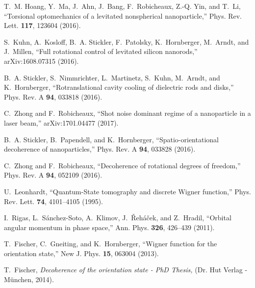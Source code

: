 \documentclass[%
 twocolumn,
 amsmath,amssymb,
 aps,
 pra,
]{revtex4-1}
\begin{document}
\begin{thebibliography}{10}
T.~M. Hoang, Y.~Ma, J.~Ahn, J.~Bang, F.~Robicheaux, Z.-Q. Yin, and T.~Li,
  \enquote{{Torsional optomechanics of a levitated nonspherical nanoparticle},}
  Phys. Rev. Lett. \textbf{117}, 123604 (2016).

S.~Kuhn, A.~Kosloff, B.~A. Stickler, F.~Patolsky, K.~Hornberger, M.~Arndt, and
  J.~Millen, \enquote{{Full rotational control of levitated silicon nanorods},}
  arXiv:1608.07315  (2016).

B.~A. Stickler, S.~Nimmrichter, L.~Martinetz, S.~Kuhn, M.~Arndt, and
  K.~Hornberger, \enquote{{Rotranslational cavity cooling of dielectric rods
  and disks},} Phys. Rev. A \textbf{94}, 033818 (2016).

C.~Zhong and F.~Robicheaux, \enquote{{Shot noise dominant regime of a
  nanoparticle in a laser beam},} arXiv:1701.04477  (2017).

B.~A. Stickler, B.~Papendell, and K.~Hornberger, \enquote{{Spatio-orientational
  decoherence of nanoparticles},} Phys. Rev. A \textbf{94}, 033828 (2016).

C.~Zhong and F.~Robicheaux, \enquote{{Decoherence of rotational degrees of
  freedom},} Phys. Rev. A \textbf{94}, 052109 (2016).

U.~Leonhardt, \enquote{{Quantum-State tomography and discrete Wigner
  function},} Phys. Rev. Lett. \textbf{74}, 4101--4105 (1995).

I.~Rigas, L.~S{\'a}nchez-Soto, A.~Klimov, J.~\v{R}eh{\'a}\v{c}ek, and
  Z.~Hradil, \enquote{{Orbital angular momentum in phase space},} Ann. Phys.
  \textbf{326}, 426--439 (2011).

T.~Fischer, C.~Gneiting, and K.~Hornberger, \enquote{{Wigner function for the
  orientation state},} New J. Phys. \textbf{15}, 063004 (2013).

T.~Fischer, \emph{{Decoherence of the orientation state - PhD Thesis,}} (Dr.
  Hut Verlag - M{\"u}nchen, 2014).

\end{thebibliography}
\end{document}
